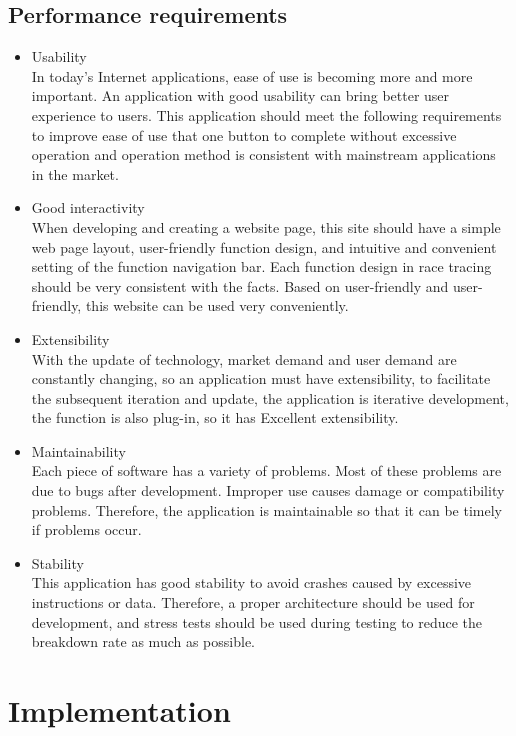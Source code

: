 \documentclass[11pt]{article}
\begin{document}
\subsection{Performance requirements}
\begin{itemize}
\item
Usability\\
In today's Internet applications, ease of use is becoming more and more important. An application with good usability can bring better user experience to users. This application should meet the following requirements to improve ease of use that one button to complete without excessive operation and operation method is consistent with mainstream applications in the market.

\item
Good interactivity\\
When developing and creating a website page, this site should have a simple web page layout, user-friendly function design, and intuitive and convenient setting of the function navigation bar. Each function design in race tracing should be very consistent with the facts. Based on user-friendly and user-friendly, this website can be used very conveniently.

\item
Extensibility\\
With the update of technology, market demand and user demand are constantly changing, so an application must have extensibility, to facilitate the subsequent iteration and update, the application is iterative development, the function is also plug-in, so it has Excellent extensibility.

\item
Maintainability\\
Each piece of software has a variety of problems. Most of these problems are due to bugs after development. Improper use causes damage or compatibility problems. Therefore, the application is maintainable so that it can be timely if problems occur.

\item
Stability\\
This application has good stability to avoid crashes caused by excessive instructions or data. Therefore, a proper architecture should be used for development, and stress tests should be used during testing to reduce the breakdown rate as much as possible.
\end{itemize}

\section{Implementation}
\end{document}
